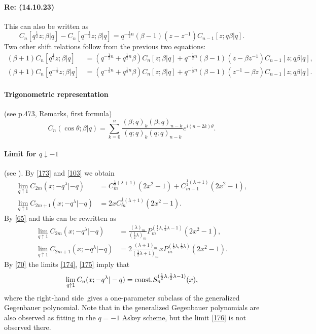 \documentclass[twoside,11pt]{article}
\newcommand\be\beta
\newcommand\tha\theta
\newcommand\la\lambda
\newcommand\half{\frac12}
\newcommand\const{{\rm const.} }
\newcommand\RHS{right-hand side}
\begin{document}
\paragraph{Re: (14.10.23)}
This can also be written as
\begin{equation}
C_n[q^\half z;\be |  q]-C_n[q^{-\half}z;\be |  q]=
q^{-\half n}(\be-1)(z-z^{-1})C_{n-1}[z;q\be |  q].
\label{25}
\end{equation}
Two other shift relations follow from the previous two equations:
\begin{align}
(\be+1)C_n[q^\half z;\be |  q]&=(q^{-\half n}+q^{\half n}\be)C_n[z;\be |  q]
+q^{-\half n}(\be-1)(z-\be z^{-1})C_{n-1}[z;q\be |  q],
\label{26}\\
(\be+1)C_n[q^{-\half}z;\be |  q]&=(q^{-\half n}+q^{\half n}\be)C_n[z;\be |  q]
+q^{-\half n}(\be-1)(z^{-1}-\be z)C_{n-1}[z;q\be |  q].
\label{27}
\end{align}
%
\paragraph{Trigonometric representation}
(see p.473, Remarks, first formula)
\begin{equation}
C_n(\cos\tha;\be |  q)=\sum_{k=0}^n
\frac{(\be;q)_k (\be;q)_{n-k}}{(q;q)_k (q;q)_{n-k}} e^{i(n-2k)\tha} .
\label{173}
\end{equation}
%
\paragraph{Limit for $q\downarrow-1$}
(see ).
By \eqref{173} and \eqref{103} we obtain
\begin{align*}
\lim_{q\uparrow1} C_{2m}(x;-q^\la | -q)&=
C_m^{\half(\la+1)}(2x^2-1)+C_{m-1}^{\half(\la+1)}(2x^2-1),\\
\lim_{q\uparrow1} C_{2m+1}(x;-q^\la | -q)&=
2x C_m^{\half(\la+1)}(2x^2-1).
\end{align*}
By \eqref{65} and  this can be rewritten as
\begin{align}
\lim_{q\uparrow1} C_{2m}(x;-q^\la | -q)&=
\frac{(\la)_m}{(\half\la)_m}  P_m^{(\half\la,\half\la-1)}(2x^2-1),
\label{174}\\
\lim_{q\uparrow1} C_{2m+1}(x;-q^\la | -q)&=
2 \frac{(\la+1)_m}{(\half\la+1)_m} x P_m^{(\half\la,\half\la)}(2x^2-1).
\label{175}
\end{align}
By \eqref{70} the limits \eqref{174}, \eqref{175} imply that
\begin{equation}
\lim_{q\uparrow1} C_n(x;-q^\la | -q)
=\const S_n^{(\half\la,\half\la-1)}(x),
\label{176}
\end{equation}
where the \RHS\ gives a one-parameter subclass of the
generalized Gegenbauer polynomial. Note that in
\cite[Section 7.1]{K28} the generalized Gegenbauer polynomials are
also observed as fitting in the $q=-1$ Askey scheme, but the limit
\eqref{176} is not observed there.
%
\end{document}
